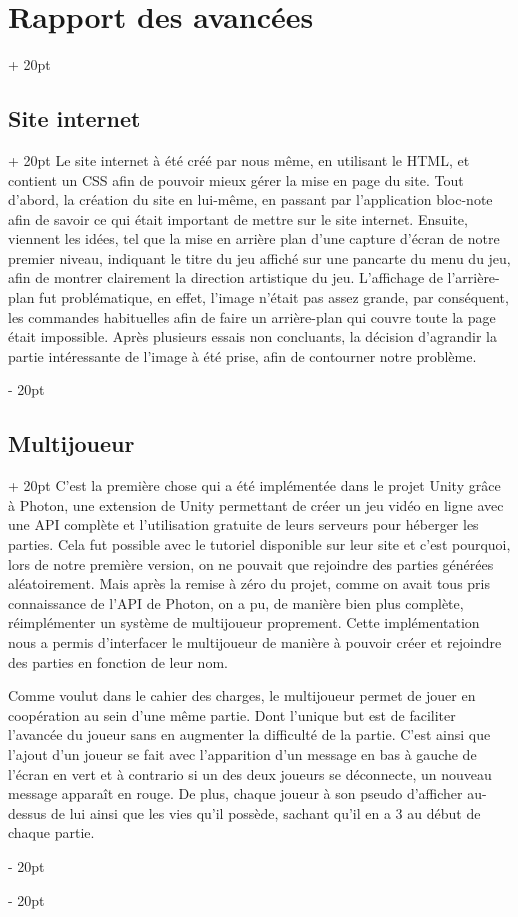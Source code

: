 \documentclass[a4paper, 12pt, twoside]{article}
\newcommand{\ind}[1][20pt]{\advance\leftskip + #1}
\newcommand{\deind}[1][20pt]{\advance\leftskip - #1}
\newenvironment{indt}[2][20pt]{#2 \par \ind[#1]}{\par \deind} %
\begin{document}
\begin{indt}{\section{Rapport des avancées}}
        \begin{indt}{\subsection{Site internet}}
            Le site internet à été créé par nous même, en utilisant le HTML, et contient un CSS afin de pouvoir mieux gérer la mise en page du site. Tout d'abord, la création du site en lui-même, en passant par l'application bloc-note afin de savoir ce qui était important de mettre sur le site internet. Ensuite, viennent les idées, tel que la mise en arrière plan d'une capture d'écran de notre premier niveau, indiquant le titre du jeu affiché sur une pancarte du menu du jeu, afin de montrer clairement la direction artistique du jeu. L'affichage de l'arrière-plan fut problématique, en effet, l'image n'était pas assez grande, par conséquent, les commandes habituelles afin de faire un arrière-plan qui couvre toute la page était impossible. Après plusieurs essais non concluants, la décision d'agrandir la partie intéressante de l'image à été prise, afin de contourner notre problème.
        \end{indt}

        \begin{indt}{\subsection{Multijoueur}}
            C'est la première chose qui a été implémentée dans le projet Unity grâce à Photon, une extension de Unity permettant de créer un jeu vidéo en ligne avec une API complète et l'utilisation gratuite de leurs serveurs pour héberger les parties. Cela fut possible avec le tutoriel disponible sur leur site et c'est pourquoi, lors de notre première version, on ne pouvait que rejoindre des parties générées aléatoirement. Mais après la remise à zéro du projet, comme on avait tous pris connaissance de l'API de Photon, on a pu, de manière bien plus complète, réimplémenter un système de multijoueur proprement. Cette implémentation nous a permis d'interfacer le multijoueur de manière à pouvoir créer et rejoindre des parties en fonction de leur nom.

            Comme voulut dans le cahier des charges, le multijoueur permet de jouer en coopération au sein d'une même partie. Dont l'unique but est de faciliter l'avancée du joueur sans en augmenter la difficulté de la partie. C'est ainsi que l'ajout d'un joueur se fait avec l'apparition d'un message en bas à gauche de l'écran en vert et à contrario si un des deux joueurs se déconnecte, un nouveau message apparaît en rouge. De plus, chaque joueur à son pseudo d'afficher au-dessus de lui ainsi que les vies qu'il possède, sachant qu'il en a 3 au début de chaque partie.


\end{indt}
\end{indt}
\end{document}
